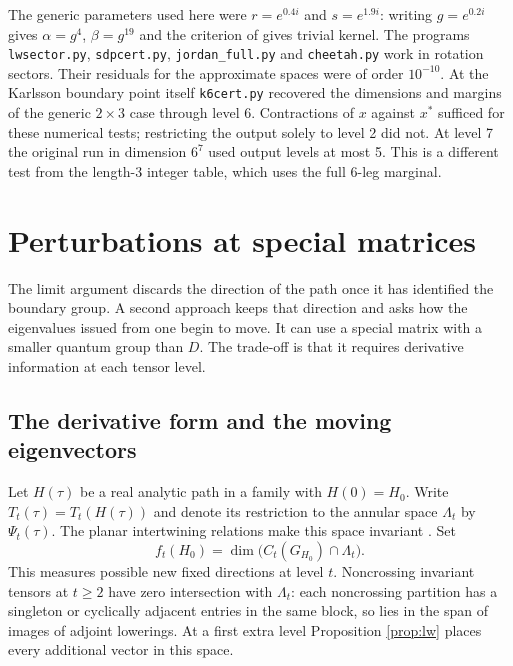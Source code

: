 \documentclass[11pt,a4paper]{amsart}
\begin{document}
The generic parameters used here were $r=e^{0.4i}$ and $s=e^{1.9i}$: writing $g=e^{0.2i}$ gives $\alpha=g^4$, $\beta=g^{19}$ and the criterion of \cite[Theorem 4.6]{bo} gives trivial kernel. The programs \texttt{lwsector.py}, \texttt{sdpcert.py}, \texttt{jordan\_full.py} and \texttt{cheetah.py} work in rotation sectors. Their residuals for the approximate spaces were of order $10^{-10}$. At the Karlsson boundary point itself \texttt{k6cert.py} recovered the dimensions and margins of the generic $2\times3$ case through level 6. Contractions of $x$ against $x^*$ sufficed for these numerical tests; restricting the output solely to level 2 did not. At level 7 the original run in dimension $6^7$ used output levels at most 5. This is a different test from the length-3 integer table, which uses the full 6-leg marginal.

\section{Perturbations at special matrices}\label{sec:pert}

The limit argument discards the direction of the path once it has identified the boundary group. A second approach keeps that direction and asks how the eigenvalues issued from one begin to move. It can use a special matrix with a smaller quantum group than $D$. The trade-off is that it requires derivative information at each tensor level.

\subsection{The derivative form and the moving eigenvectors}
Let $H(\tau)$ be a real analytic path in a family with $H(0)=H_0$. Write $T_t(\tau)=T_t(H(\tau))$ and denote its restriction to the annular space $\Lambda_t$ by $\Psi_t(\tau)$. The planar intertwining relations make this space invariant \cite[Section 9]{bo}. Set
\[
 f_t(H_0)=\dim\big(C_t(G_{H_0})\cap\Lambda_t\big).
\]
This measures possible new fixed directions at level $t$. Noncrossing invariant tensors at $t\geq2$ have zero intersection with $\Lambda_t$: each noncrossing partition has a singleton or cyclically adjacent entries in the same block, so lies in the span of images of adjoint lowerings. At a first extra level Proposition \ref{prop:lw} places every additional vector in this space.
\end{document}

